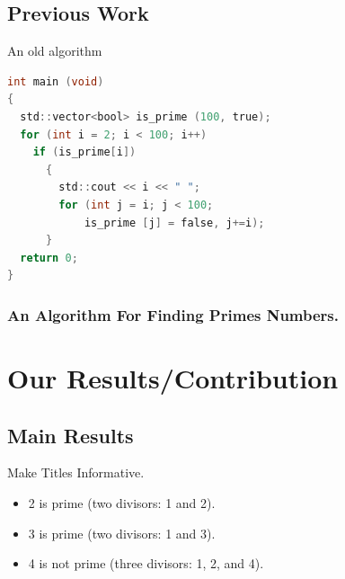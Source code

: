 \documentclass[ucs,8pt]{beamer}
\begin{document}
\subsection{Previous Work}

\begin{frame}[fragile]{An old algorithm}
\begin{lstlisting}[language=C]
int main (void)
{
  std::vector<bool> is_prime (100, true);
  for (int i = 2; i < 100; i++)
    if (is_prime[i])
      {
        std::cout << i << " ";
        for (int j = i; j < 100;
            is_prime [j] = false, j+=i);
      }
  return 0;
}
\end{lstlisting}
\end{frame}

\begin{frame}[fragile]
  \frametitle{An Algorithm For Finding Primes Numbers.}
\begin{semiverbatim}
\end{semiverbatim}
\end{frame}

\section{Our Results/Contribution}

\subsection{Main Results}

\begin{frame}{Make Titles Informative.}
  \begin{example}
    \begin{itemize}
    \item 2 is prime (two divisors: 1 and 2).
    \item 3 is prime (two divisors: 1 and 3).
    \item 4 is not prime (\alert{three} divisors: 1, 2, and 4).
    \end{itemize}
  \end{example}
\end{frame}
\end{document}
